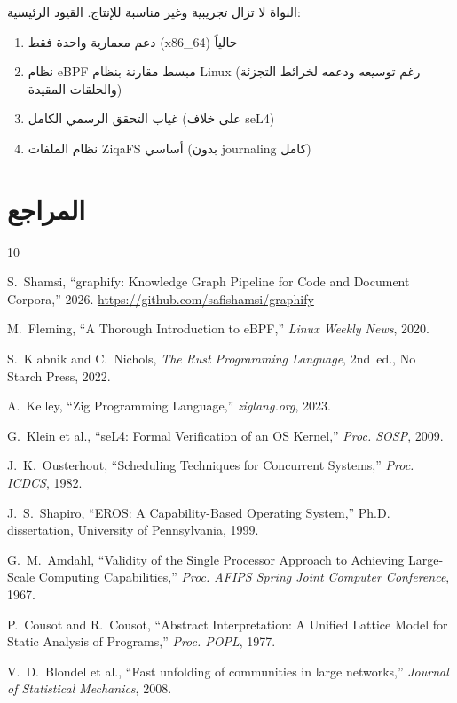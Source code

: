 \documentclass[12pt,a4paper]{article}
\theoremstyle{definition}
\newcommand{\en}[1]{\textenglish{#1}}
\begin{document}
\vspace{0.5cm}

\begin{warningbox}
النواة لا تزال تجريبية وغير مناسبة للإنتاج. القيود الرئيسية:
\begin{enumerate}[leftmargin=2em]
\item دعم معمارية واحدة فقط (x86\_64) حالياً
\item نظام eBPF مبسط مقارنة بنظام \en{Linux} (رغم توسيعه ودعمه لخرائط التجزئة والحلقات المقيدة)
\item غياب التحقق الرسمي الكامل (على خلاف seL4)
\item نظام الملفات \en{ZiqaFS} أساسي (بدون \en{journaling} كامل)
\end{enumerate}
\end{warningbox}

\newpage

\section*{المراجع}

\begin{thebibliography}{10}

\en{S}.~Shamsi,
``\en{graphify}: Knowledge Graph Pipeline for Code and Document Corpora,''
2026. \url{https://github.com/safishamsi/graphify}

M.~Fleming,
``A Thorough Introduction to eBPF,''
\textit{\en{Linux} Weekly News}, 2020.

\en{S}.~Klabnik and C.~Nichols,
\textit{The Rust Programming Language}, 2nd~ed.,
No Starch Press, 2022.

A.~Kelley,
``Zig Programming Language,''
\textit{ziglang.org}, 2023.

G.~Klein et al.,
``seL4: Formal Verification of an OS Kernel,''
\textit{Proc. SOSP}, 2009.

J.~K.~Ousterhout,
``Scheduling Techniques for Concurrent Systems,''
\textit{Proc. ICDCS}, 1982.

J.~\en{S}.~Shapiro,
``EROS: A \en{Capability-Based} Operating System,''
Ph.D. dissertation, University of Pennsylvania, 1999.

G.~M.~Amdahl,
``Validity of the Single Processor Approach to Achieving Large-Scale
Computing Capabilities,''
\textit{Proc. AFIPS Spring Joint Computer Conference}, 1967.

P.~Cousot and R.~Cousot,
``\en{Abstract Interpretation}: A Unified Lattice Model for Static Analysis
of Programs,''
\textit{Proc. POPL}, 1977.

V.~D.~Blondel et al.,
``F\en{ast} unfolding of communities in large networks,''
\textit{Journal of Statistical Mechanics}, 2008.

\end{thebibliography}
\end{document}
